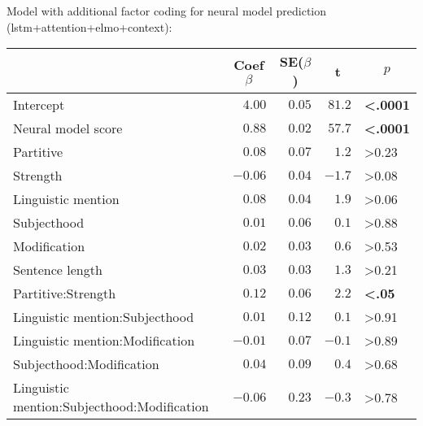 \documentclass{sp}
\begin{document}
Model with additional factor coding for neural model prediction (lstm+attention+elmo+context):

\begin{table}[!tbp]
\begin{center}
\begin{tabular}{lrrrl}
\toprule
\multicolumn{1}{l}{}&\multicolumn{1}{c}{Coef $\beta$}&\multicolumn{1}{c}{SE($\beta$)}&\multicolumn{1}{c}{\textbf{t}}&\multicolumn{1}{c}{$p$}\tabularnewline
\midrule
Intercept&$ 4.00$&$0.05$&$81.2$&\textbf{\textless .0001}\tabularnewline
Neural model score&$ 0.88$&$0.02$&$57.7$&\textbf{\textless .0001}\tabularnewline
Partitive&$ 0.08$&$0.07$&$ 1.2$&\textgreater 0.23\tabularnewline
Strength&$-0.06$&$0.04$&$-1.7$&\textgreater 0.08\tabularnewline
Linguistic mention&$ 0.08$&$0.04$&$ 1.9$&\textgreater 0.06\tabularnewline
Subjecthood&$ 0.01$&$0.06$&$ 0.1$&\textgreater 0.88\tabularnewline
Modification&$ 0.02$&$0.03$&$ 0.6$&\textgreater 0.53\tabularnewline
Sentence length&$ 0.03$&$0.03$&$ 1.3$&\textgreater 0.21\tabularnewline
Partitive:Strength&$ 0.12$&$0.06$&$ 2.2$&\textbf{\textless .05}\tabularnewline
Linguistic mention:Subjecthood&$ 0.01$&$0.12$&$ 0.1$&\textgreater 0.91\tabularnewline
Linguistic mention:Modification&$-0.01$&$0.07$&$-0.1$&\textgreater 0.89\tabularnewline
Subjecthood:Modification&$ 0.04$&$0.09$&$ 0.4$&\textgreater 0.68\tabularnewline
Linguistic mention:Subjecthood:Modification&$-0.06$&$0.23$&$-0.3$&\textgreater 0.78\tabularnewline
\bottomrule
\end{tabular}\end{center}
\end{table}
\end{document}
